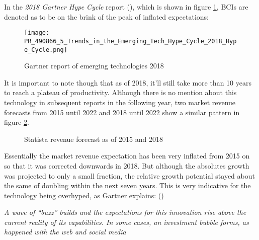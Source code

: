             In the \textit{2018 Gartner Hype Cycle} report (\cite{Gartner.24052021}), which is shown in figure \ref*{gartner-2018}, BCIs are denoted as to be on the brink of the peak of inflated expectations:

            \begin{figure}[h]     %
                \centering
                \texttt{[image: PR\_490866\_5\_Trends\_in\_the\_Emerging\_Tech\_Hype\_Cycle\_2018\_Hype\_Cycle.png]} 
                \caption{Gartner report of emerging technologies 2018}\label{gartner-2018}
            \end{figure}

            It is important to note though that as of 2018, it'll still take more than 10 years to reach a plateau of productivity.
            Although there is no mention about this technology in subsequent reports in the following year, two market revenue forecasts from 2015 until 2022 and 2018 until 2022 show a similar pattern in figure \ref*{statista-revenue}.

            \begin{figure}[h]
                \centering
                \caption{Statista revenue forecast as of 2015 and 2018}%
                \label{statista-revenue}
            \end{figure}        

            Essentially the market revenue expectation has been very inflated from 2015 on so that it was corrected downwards in 2018. But although the absolutes growth was projected to only a small fraction, the relative growth potential stayed about the same of doubling within the next seven years. This is very indicative for the technology being overhyped, as Gartner explains: (\cite{Gartner.24052021})

            \medskip
                \emph{A wave of “buzz” builds and the expectations for this innovation rise above the current reality of its capabilities. In some cases, an investment bubble forms, as happened with the web and social media}
            \medskip

